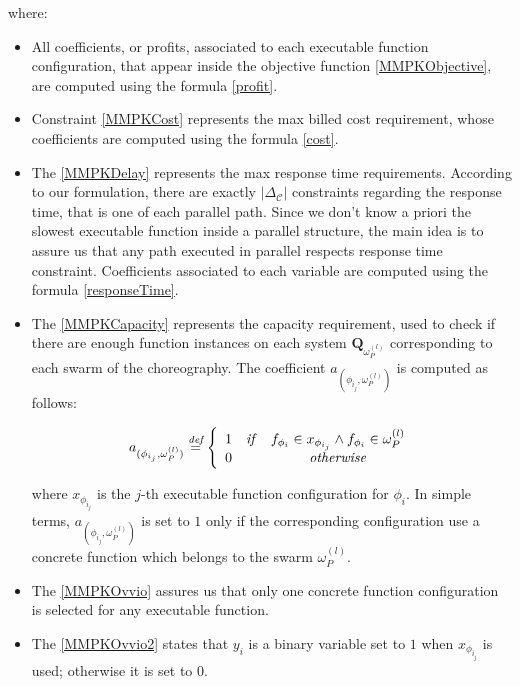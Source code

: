 \documentclass[12pt,a4paper]{report}
\newcommand{\mathDef}{\overset{\textit{def}}{=}}
\begin{document}
where:

\begin{itemize}
	\item All coefficients, or profits, associated to each executable function configuration, that appear inside the objective function \ref{MMPKObjective}, are computed using the formula \ref{profit}.
	
	\item Constraint \ref{MMPKCost} represents the max billed cost requirement, whose coefficients are computed using the formula \ref{cost}. 
	
    \item The \ref{MMPKDelay} represents the max response time requirements. According to our formulation, there are exactly $|\Delta_{\mathcal{C}}|$ constraints regarding the response time, that is one of each parallel path. Since we don't know a priori the slowest executable function inside a parallel structure, the main idea is to assure us that any path executed in parallel respects response time constraint. Coefficients associated to each variable are computed using the formula \ref{responseTime}.
    
    \item The \ref{MMPKCapacity} represents the capacity requirement, used to check if there are enough function instances on each system $\textbf{Q}_{\omega_{P}^{(l)}}$ corresponding to each swarm of the choreography. The coefficient $a_{(\phi_{i_{j}},\omega_{P}^{(l)})}$ is computed as follows:
    
    \begin{equation}	
    	a_{(\phi_{i_{j}},\omega_{P}^{(l)})} \mathDef \left\{
    	\begin{array}{lcc}
    		1 & \text{\textit{if}} & f_{\phi_i} \in x_{\phi_{i_j}} \wedge f_{\phi_i} \in \omega_{P}^{(l)} \\ 
    		0 & & \text{\textit{otherwise}} \\
    	\end{array} \right.
    \end{equation}
    
	where $x_{\phi_{i_j}}$ is the $j$-th executable function configuration for $\phi_i$. In simple terms, $a_{(\phi_{i_{j}},\omega_{P}^{(l)})}$ is set to $1$ only if the corresponding configuration use a concrete function which belongs to the swarm $\omega_{P}^{(l)}$.
	
	\item The \ref{MMPKOvvio} assures us that only one concrete function configuration is selected for any executable function. 
	
	\item The \ref{MMPKOvvio2} states that $y_i$ is a binary variable set to $1$ when $x_{\phi_{i_j}}$ is used; otherwise it is set to $0$.
	
\end{itemize}
\end{document}

